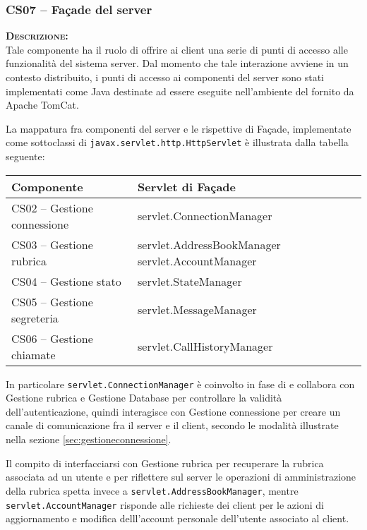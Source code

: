 \subsubsection{CS07 -- Façade del server}
\begin{description}
	\item{\scshape\bfseries Descrizione:}\\
Tale componente ha il ruolo di offrire ai client una serie di punti di accesso alle funzionalità del sistema server. Dal momento che tale interazione avviene in un contesto distribuito, i punti di accesso ai componenti del server sono stati implementati come  Java destinate ad essere eseguite nell'ambiente del  fornito da Apache TomCat.

La mappatura fra componenti del server e le rispettive  di Façade, implementate come sottoclassi di \texttt{javax.servlet.http.HttpServlet} è illustrata dalla tabella seguente:
\begin{center}
\begin{tabular}{>{\sffamily}l>{\ttfamily}p{}}
\toprule
\textbf{\rmfamily Componente} & \textbf{\rmfamily Servlet di Façade}\\
\midrule
CS02 -- Gestione connessione & servlet.ConnectionManager\\
CS03 -- Gestione rubrica & servlet.AddressBookManager servlet.AccountManager\\
CS04 -- Gestione stato & servlet.StateManager\\
CS05 -- Gestione segreteria & servlet.MessageManager\\
CS06 -- Gestione chiamate & servlet.CallHistoryManager\\
\bottomrule
\end{tabular}
\end{center}

In particolare \texttt{servlet.ConnectionManager} è coinvolto in fase di  e collabora con \textsf{Gestione rubrica} e \textsf{Gestione Database} per controllare la validità dell'autenticazione, quindi interagisce con \textsf{Gestione connessione} per creare un canale di comunicazione fra il server e il client, secondo le modalità illustrate nella sezione \ref{sec:gestioneconnessione}.

Il compito di interfacciarsi con \textsf{Gestione rubrica} per recuperare la rubrica associata ad un utente e per riflettere sul server le operazioni di amministrazione della rubrica spetta invece a \texttt{servlet.AddressBookManager}, mentre \texttt{servlet.AccountManager} risponde alle richieste dei client per le azioni di aggiornamento e modifica delll'account personale dell'utente associato al client.


\end{description}
